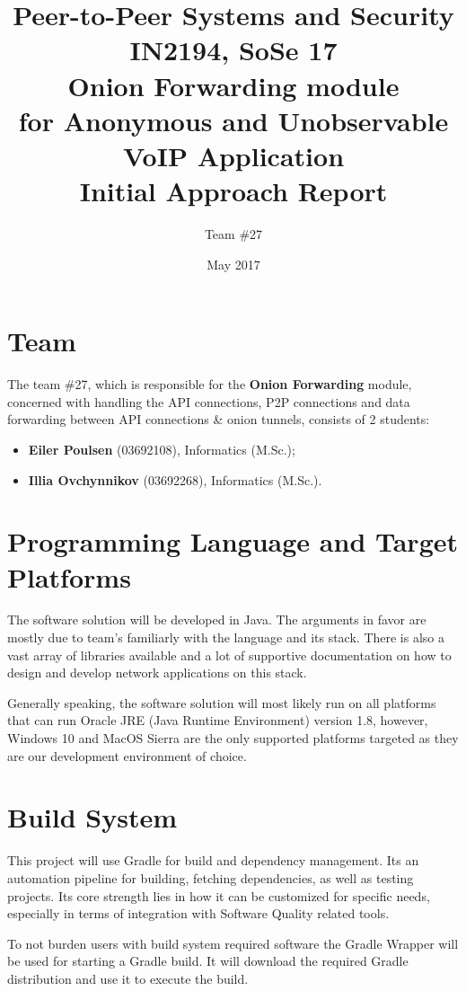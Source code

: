 \documentclass{article}
\title{Peer-to-Peer Systems and Security \\
        \large{IN2194, SoSe 17} \\
        \huge{Onion Forwarding module} \\
        \small{for Anonymous and Unobservable VoIP Application} \\
        \bigbreak
        \large{\textbf{Initial Approach Report}}}
\author{Team \#27}
\date{May 2017}
\begin{document}
\maketitle


\section{Team}
The team \#27, which is responsible for the \textbf{Onion Forwarding} module, concerned with handling the API connections, P2P connections and data forwarding between API connections \& onion tunnels, consists of 2 students:

\begin{itemize}
\item \textbf{Eiler Poulsen} (03692108), Informatics (M.Sc.);
\item \textbf{Illia Ovchynnikov} (03692268), Informatics (M.Sc.).
\end{itemize}

\section{Programming Language and Target Platforms}
The software solution will be developed in Java. The arguments in favor are mostly due to team's familiarly with the language and its stack. There is also a vast array of libraries available and a lot of supportive documentation on how to design and develop network applications on this stack.

Generally speaking, the software solution will most likely run on all platforms that can run Oracle JRE (Java Runtime Environment) version 1.8, however, Windows 10 and MacOS Sierra are the only supported platforms targeted as they are our development environment of choice.

\section{Build System}
This project will use Gradle for build and dependency management. Its an automation pipeline for building, fetching dependencies, as well as testing projects. Its core strength lies in how it can be customized for specific needs, especially in terms of integration with Software Quality related tools.

To not burden users with build system required software the Gradle Wrapper will be used for starting a Gradle build. It will download the required Gradle distribution and use it to execute the build.
\end{document}
